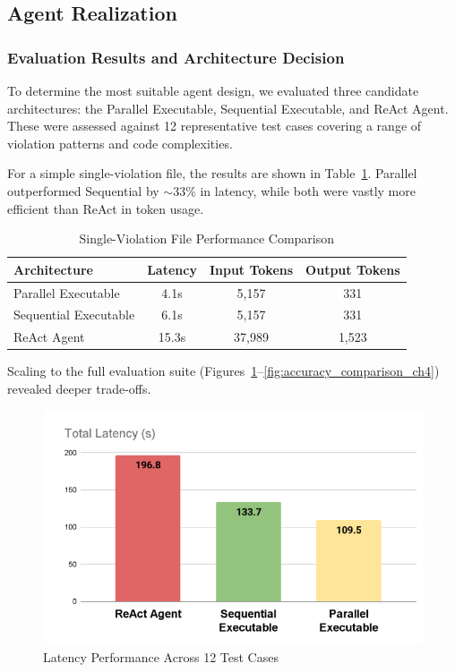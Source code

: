 \begin{spacing}{1.2}
\subsection{Agent Realization}

\subsubsection{Evaluation Results and Architecture Decision}
To determine the most suitable agent design, we evaluated three candidate architectures: the Parallel Executable, 
Sequential Executable, and ReAct Agent. These were assessed against 12 representative test cases covering 
a range of violation patterns and code complexities.  

For a simple single-violation file, the results are shown in 
Table~\ref{tab:single_violation_performance_ch4}. Parallel outperformed Sequential by $\sim$33\% in latency, 
while both were vastly more efficient than ReAct in token usage.

\begin{table}[H]
\centering
\caption{Single-Violation File Performance Comparison}
\label{tab:single_violation_performance_ch4}
\footnotesize
\begin{tabular}{|l|c|c|c|}
\hline 
\textbf{Architecture} & \textbf{Latency} & \textbf{Input Tokens} & \textbf{Output Tokens} \\
\hline 
Parallel Executable & 4.1s & 5,157 & 331 \\
\hline
Sequential Executable & 6.1s & 5,157 & 331 \\
\hline
ReAct Agent & 15.3s & 37,989 & 1,523 \\
\hline
\end{tabular}
\end{table}

Scaling to the full evaluation suite (Figures~\ref{fig:latency_comparison_ch4}--\ref{fig:accuracy_comparison_ch4}) 
revealed deeper trade-offs.


\begin{figure}[H]
\centering
\includegraphics[scale=0.5]{images/latency.png}
\caption{Latency Performance Across 12 Test Cases}
\label{fig:latency_comparison_ch4}
\end{figure}


\end{spacing}
